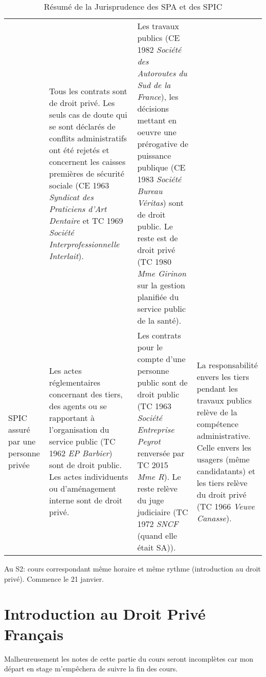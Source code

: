\documentclass[math]{cours}
\begin{document}
\begin{table}
\begin{tabular}{p{.2\linewidth}p{.2\linewidth}p{.2\linewidth}p{.2\linewidth}}
		 & Tous les contrats sont de droit privé. Les seuls cas de doute qui se sont déclarés de conflits administratifs ont été rejetés et concernent les caisses premières de sécurité sociale (CE 1963 \emph{Syndicat des Praticiens d'Art Dentaire} et TC 1969 \emph{Société Interprofessionnelle Interlait}).
		 & Les travaux publics (CE 1982 \emph{Société des Autoroutes du Sud de la France}), les décisions mettant en oeuvre une prérogative de puissance publique (CE 1983 \emph{Société Bureau Véritas}) sont de droit public. Le reste est de droit privé (TC 1980 \emph{Mme Girinon} sur la gestion planifiée du service public de la santé).
		\\
		SPIC assuré par une personne privée
		 & Les actes réglementaires concernant des tiers, des agents ou se rapportant à l'organisation du service public (TC 1962 \emph{EP Barbier}) sont de droit public. Les actes individuents ou d'aménagement interne sont de droit privé.
		 & Les contrats pour le compte d'une personne public sont de droit public (TC 1963 \emph{Société Entreprise Peyrot} renversée par TC 2015 \emph{Mme R}). Le reste relève du juge judiciaire (TC 1972 \emph{SNCF} (quand elle était SA)).
		 & La responsabilité envers les tiers pendant les travaux publics relève de la compétence administrative. Celle envers les usagers (même candidatants) et les tiers relève du droit privé (TC 1966 \emph{Veuve Canasse}).
	\end{tabular}
	\caption{Résumé de la Jurisprudence des SPA et des SPIC}
\end{table}

Au S2: cours correspondant même horaire et même rythme (introduction au droit privé). Commence le 21 janvier.

\part{Introduction au Droit Privé Français}
Malheureusement les notes de cette partie du cours seront incomplètes car mon départ en stage m'empêchera de suivre la fin des cours.
\end{document}

